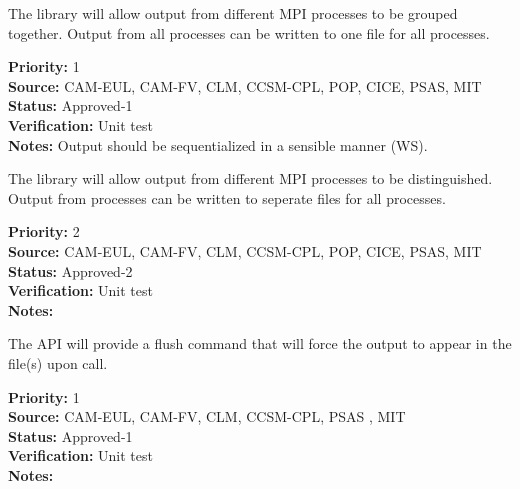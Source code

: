 The library will allow output from different MPI processes to be grouped together.  
Output from all processes can be written to one file for all processes.

\begin{reqlist}
{\bf Priority:} 1 \\
{\bf Source:} CAM-EUL, CAM-FV, CLM, CCSM-CPL, POP, CICE, PSAS, MIT  \\
{\bf Status:} Approved-1 \\
{\bf Verification:} Unit test \\
{\bf Notes:} Output should be sequentialized in a sensible manner (WS).
\end{reqlist}

The library will allow output from different MPI processes to be distinguished.
Output from processes can be written to seperate files for all processes.

\begin{reqlist}
{\bf Priority:} 2 \\
{\bf Source:} CAM-EUL, CAM-FV, CLM, CCSM-CPL, POP, CICE, PSAS, MIT  \\
{\bf Status:} Approved-2 \\
{\bf Verification:} Unit test \\
{\bf Notes:} 
\end{reqlist}

The API will provide a flush command that will force the output to appear in the file(s)
upon call.

\begin{reqlist}
{\bf Priority:} 1 \\
{\bf Source:} CAM-EUL, CAM-FV, CLM, CCSM-CPL, PSAS , MIT \\
{\bf Status:} Approved-1 \\
{\bf Verification:} Unit test \\
{\bf Notes:} 
\end{reqlist}








